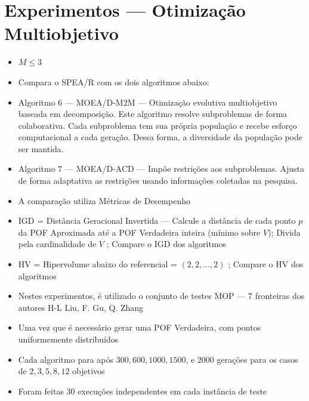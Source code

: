 \documentclass{rbfin}
\begin{document}






\newpage
\section{Experimentos --- Otimização Multiobjetivo}

\vspace{6mm}

\begin{itemize}
  \item $M \le 3$
  \item Compara o SPEA/R com os dois algoritmos abaixo:
  \item Algoritmo $6$ --- MOEA/D-M2M --- Otimização evolutiva multiobjetivo baseada em decomposição. Este algoritmo resolve subproblemas de forma colaborativa. Cada subproblema tem sua própria população e recebe esforço computacional a cada geração. Dessa forma, a diversidade da população pode ser mantida.
  \item Algoritmo $7$ --- MOEA/D-ACD --- Impõe restrições aos subproblemas. Ajusta de forma adaptativa as restrições usando informações coletadas na pesquisa.
  \item A comparação utiliza Métricas de Desempenho
  \item IGD = Distância Geracional Invertida --- Calcule a distância de cada ponto $p$ da POF Aproximada até a POF Verdadeira inteira (mínimo sobre $V$); Divida pela cardinalidade de $V$ ; Compare o IGD dos algoritmos
  \item HV = Hipervolume abaixo do referencial = $(2, 2, ..., 2)$ ; Compare o HV dos algoritmos
  \item Nestes experimentos, é utilizado o conjunto de testes MOP --- $7$ fronteiras dos autores H-L Liu, F. Gu, Q. Zhang
  \item Uma vez que é necessário gerar uma POF Verdadeira, com pontos uniformemente distribuídos
  \item Cada algoritmo para após $300, 600, 1000, 1500$, e $2000$ gerações para os casos de $2, 3, 5, 8, 12$ objetivos
  \item Foram feitas $30$ execuções independentes em cada instância de teste
\end{itemize}
\end{document}
